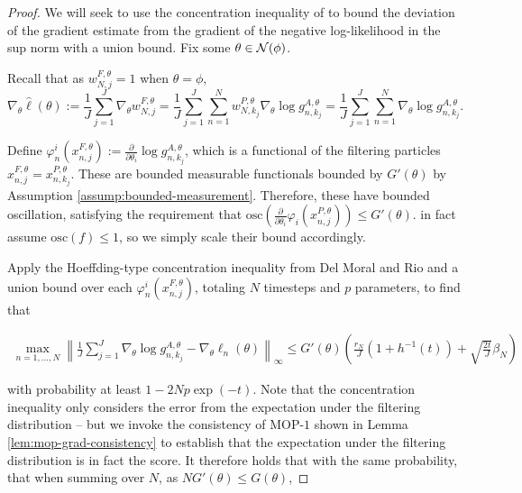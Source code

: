 \documentclass{article}
\begin{document}
\begin{proof}


We will seek to use the concentration inequality of \cite{delmoral2011ci} to bound the deviation of the gradient estimate from the gradient of the negative log-likelihood in the sup norm with a union bound. Fix some $\theta \in {\mathcal{N}}(\phi)$.


Recall that as $w_{N, j}^{F, \theta}=1$ when $\theta=\phi$,
$$
\nabla_\theta \hat{\ell}(\theta):=\frac{1}{J} \sum_{j=1}^J \nabla_\theta w_{N, j}^{F, \theta}=\frac{1}{J} \sum_{j=1}^J\sum_{n=1}^N  w_{N, k_j}^{P, \theta} \nabla_\theta \log g_{n,k_j}^{A,\theta} = \frac{1}{J} \sum_{j=1}^J\sum_{n=1}^N \nabla_\theta \log g_{n,k_j}^{A,\theta}.
$$

Define $\varphi_n^i(x_{n,j}^{F,\theta}) := \frac{\partial}{\partial\theta_i} \log g_{n,k_j}^{A,\theta}$, which is a functional of the filtering particles $x_{n,j}^{F,\theta} = x_{n,k_j}^{P,\theta}$. These are bounded measurable functionals bounded by $G'(\theta)$ by Assumption \ref{assump:bounded-measurement}. Therefore, these have bounded oscillation, satisfying the requirement that $\text{osc} \left(\frac{\partial}{\partial\theta_i} \varphi_i(x_{n,j}^{P,\theta}) \right) \leq G'(\theta)$. \cite{delmoral2011ci} in fact assume $\text{osc}(f) \leq 1$, so we simply scale their bound accordingly.


Apply the Hoeffding-type concentration inequality from Del Moral and Rio \cite{delmoral2011ci} and a union bound over each $\varphi_n^i(x_{n,j}^{F,\theta})$, totaling $N$ timesteps and $p$ parameters, to find that

\begin{align}
    \max_{n=1,...,N} \left\lVert\frac{1}{J}\sum_{j=1}^J\nabla_\theta \log g_{n,k_j}^{A,\theta} - \nabla_\theta \ell_n(\theta) \right\rVert_{\infty} \leq G'(\theta)\left(\frac{r_N}{J}(1+h^{-1}(t)) + \sqrt{\frac{2t}{J}}\beta_N \right)
\end{align}

with probability at least $1-2Np\exp(-t)$. Note that the concentration inequality only considers the error from the expectation under the filtering distribution -- but we invoke the consistency of MOP-$1$ shown in Lemma \ref{lem:mop-grad-consistency} to establish that the expectation under the filtering distribution is in fact the score. It therefore holds that with the same probability, that when summing over $N$, as $NG'(\theta) \leq G(\theta)$, 


\end{proof}
\end{document}
